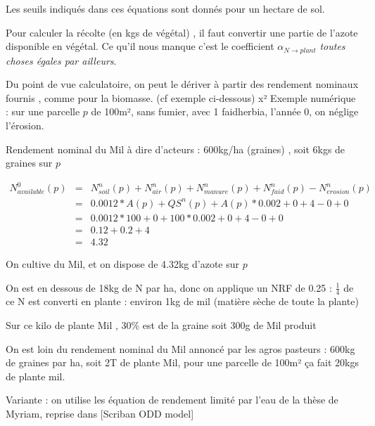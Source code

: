 \documentclass[10pt,a4paper,french]{article} %
\begin{document}
  


Les seuils indiqués dans ces équations sont donnés pour un hectare de sol.





Pour calculer la récolte (en kgs de végétal) , il faut convertir une partie de l'azote disponible en végétal.
Ce qu'il nous manque c'est le coefficient $\alpha_{N \rightarrow plant}$  \emph{toutes choses égales par ailleurs}. 



Du point de vue calculatoire, on peut le dériver à partir des rendement nominaux fournis , comme pour la biomasse. (cf exemple ci-dessous)
x²
Exemple numérique : 
sur une parcelle $p$ de 100m², sans fumier, avec 1 faidherbia, l'année 0, on néglige l'érosion.

Rendement nominal du Mil à dire d'acteurs : 600kg/ha (graines) , soit 6kgs de graines sur $p$

\begin{eqnarray*}
N_{available}^{0}(p)&=&N_{soil}^{n}(p)  +N_{air}^{n}(p)+N_{manure}^{n}(p)+N_{faid}^{n}(p)-N_{erosion}^n(p)  \\
                    &=& 0.0012 * A(p) + QS^{n}(p) + A(p) * 0.002 +0                +4              -0                + 0  \\
                    &=&  0.0012 * 100 + 0 + 100 * 0.002 +0+4-0 + 0  \\
                    &=&  0.12 + 0.2 +4  \\
                    &=& 4.32
\end{eqnarray*}

On cultive  du Mil, et on dispose de 4.32kg d'azote sur $p$

On est en dessous de 18kg de N par ha, donc on applique un NRF de 0.25 : $\frac{1}{4}$ de ce N est converti en plante : environ 1kg de mil (matière sèche de toute la plante)

Sur ce kilo de plante Mil , 30\% est de la graine soit 300g de Mil produit

On est loin du rendement nominal du Mil annoncé par les agros pasteurs : 600kg de graines par ha, soit 2T de plante Mil, pour une parcelle de 100m² ça fait 20kgs de plante mil.  





Variante : on utilise les équation de rendement limité par l'eau de la thèse de Myriam, reprise dans [Scriban ODD model]
\end{document}
